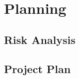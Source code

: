 \chapter{Planning}\label{ch:planning}

\section{Risk Analysis}\label{sec:risk-analysis}

\section{Project Plan}\label{sec:project-plan}

